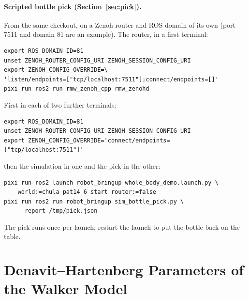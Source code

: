 \paragraph{Scripted bottle pick (Section~\ref{sec:pick}).} From the same checkout, on a Zenoh router
and ROS domain of its own (port 7511 and domain 81 are an example). The router, in a first terminal:
\begin{verbatim}
export ROS_DOMAIN_ID=81
unset ZENOH_ROUTER_CONFIG_URI ZENOH_SESSION_CONFIG_URI
export ZENOH_CONFIG_OVERRIDE=\
'listen/endpoints=["tcp/localhost:7511"];connect/endpoints=[]'
pixi run ros2 run rmw_zenoh_cpp rmw_zenohd
\end{verbatim}
First in each of two further terminals:
\begin{verbatim}
export ROS_DOMAIN_ID=81
unset ZENOH_ROUTER_CONFIG_URI ZENOH_SESSION_CONFIG_URI
export ZENOH_CONFIG_OVERRIDE='connect/endpoints=["tcp/localhost:7511"]'
\end{verbatim}
then the simulation in one and the pick in the other:
\begin{verbatim}
pixi run ros2 launch robot_bringup whole_body_demo.launch.py \
    world:=chula_pat14_6 start_router:=false
pixi run ros2 run robot_bringup sim_bottle_pick.py \
    --report /tmp/pick.json
\end{verbatim}
The pick runs once per launch; restart the launch to put the bottle back on the table.

\section{Denavit--Hartenberg Parameters of the Walker Model}
\label{app:dh}

